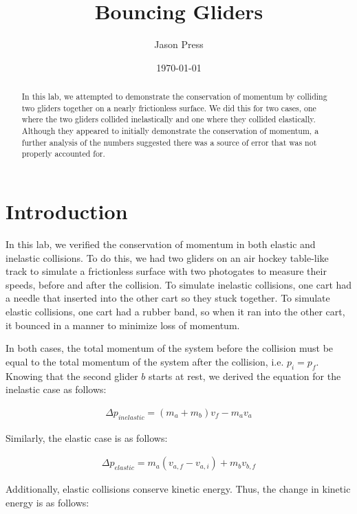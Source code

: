 \documentclass[12pt]{article}
\author{Jason Press}
\date{\today}
\title{Bouncing Gliders}
\begin{document}
\maketitle
\begin{abstract}


In this lab, we attempted to demonstrate the conservation of momentum by colliding two gliders together on a nearly frictionless surface. We did this for two cases, one where the two gliders collided inelastically and one where they collided elastically. Although they appeared to initially demonstrate the conservation of momentum, a further analysis of the numbers suggested there was a source of error that was not properly accounted for.
\end{abstract}
\section{Introduction}
\label{sec:org31b2ab9}

In this lab, we verified the conservation of momentum in both elastic and inelastic collisions. To do this, we had two gliders on an air hockey table-like track to simulate a frictionless surface with two photogates to measure their speeds, before and after the collision. To simulate inelastic collisions, one cart had a needle that inserted into the other cart so they stuck together. To simulate elastic collisions, one cart had a rubber band, so when it ran into the other cart, it bounced in a manner to minimize loss of momentum.

In both cases, the total momentum of the system before the collision must be equal to the total momentum of the system after the collision, i.e. \(p_i = p_f\). Knowing that the second glider \(b\) starts at rest, we derived the equation for the inelastic case as follows:

\begin{align}\label{eq:inelastic}
\Delta p_{inelastic} = \left( m_a + m_b \right) v_f - m_a v_a
\end{align}

Similarly, the elastic case is as follows:

\begin{align}\label{eq:elastic}
\Delta p_{elastic} = m_a \left( v_{a,f} - v_{a,i} \right) + m_b v_{b,f}
\end{align}

Additionally, elastic collisions conserve kinetic energy. Thus, the change in kinetic energy is as follows:
\end{document}
